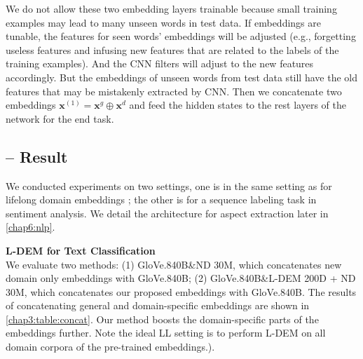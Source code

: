 We do not allow these two embedding layers trainable because small training examples may lead to many unseen words in test data.
If embeddings are tunable, the features for seen words' embeddings will be adjusted (e.g., forgetting useless features and infusing new features that are related to the labels of the training examples).
And the CNN filters will adjust to the new features accordingly. 
But the embeddings of unseen words from test data still have the old features that may be mistakenly extracted by CNN.
Then we concatenate two embeddings $\mathbf{x}^{(1)}=\mathbf{x}^g \oplus \mathbf{x}^d$ and feed the hidden states to the rest layers of the network for the end task.

\subsection{-- Result}
We conducted experiments on two settings, one is in the same setting as for lifelong domain embeddings \cite{xumeta}; the other is for a sequence labeling task in sentiment analysis. We detail the architecture for aspect extraction later in \ref{chap6:nlp}.

\textbf{L-DEM for Text Classification}\\
We evaluate two methods: (1) GloVe.840B\&ND 30M, which concatenates new domain only embeddings with GloVe.840B; (2) GloVe.840B\&L-DEM 200D + ND 30M, which concatenates our proposed embeddings with GloVe.840B. 
The results of concatenating general and domain-specific embeddings are shown in \ref{chap3:table:concat}.
Our method boosts the domain-specific parts of the embeddings further.
Note the ideal LL setting is to perform L-DEM on all domain corpora of the pre-trained embeddings.).

\begin{table}
\begin{center}
\end{center}
\label{chap3:table:concat}
\caption{Concatenating Word Embeddings}
\end{table}

